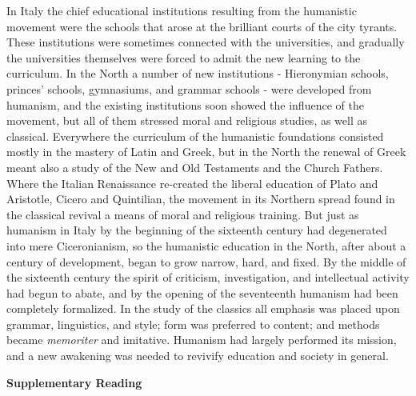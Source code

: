 \documentclass[
]{book}
\begin{document}
In Italy the chief educational institutions resulting from the humanistic movement were the schools that arose at the brilliant courts of the city tyrants. These institutions were sometimes connected with the universities, and gradually the universities themselves were forced to admit the new learning to the curriculum. In the North a number of new institutions - Hieronymian schools, princes' schools, gymnasiums, and grammar schools - were developed from humanism, and the existing institutions soon showed the influence of the movement, but all of them stressed moral and religious studies, as well as classical. Everywhere the curriculum of the humanistic foundations consisted mostly in the mastery of Latin and Greek, but in the North the renewal of Greek meant also a study of the New and Old Testaments and the Church Fathers. Where the Italian Renaissance re-created the liberal education of Plato and Aristotle, Cicero and Quintilian, the movement in its Northern spread found in the classical revival a means of moral and religious training. But just as humanism in Italy by the beginning of the sixteenth century had degenerated into mere Ciceronianism, so the humanistic education in the North, after about a century of development, began to grow narrow, hard, and fixed. By the middle of the sixteenth century the spirit of criticism, investigation, and intellectual activity had begun to abate, and by the opening of the seventeenth humanism had been completely formalized. In the study of the classics all emphasis was placed upon grammar, linguistics, and style; form was preferred to content; and methods became \emph{memoriter} and imitative. Humanism had largely performed its mission, and a new awakening was needed to revivify education and society in general.

\textbf{Supplementary Reading}
\end{document}
